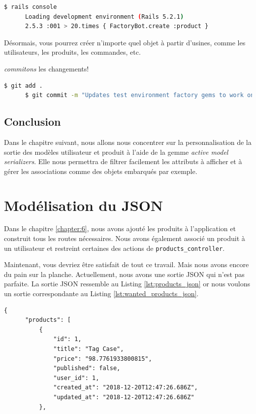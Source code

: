 \documentclass[]{report}
\begin{document}
    \begin{scriptsize}
      \begin{lstlisting}[language=bash]
      $ rails console
      Loading development environment (Rails 5.2.1)
      2.5.3 :001 > 20.times { FactoryBot.create :product }
      \end{lstlisting}
    \end{scriptsize}

    Désormais, vous pourrez créer n'importe quel objet à partir d'usines, comme les utilisateurs, les produits, les commandes, etc.

    \textit{commitons} les changements!

    \begin{scriptsize}
      \begin{lstlisting}[language=bash]
      $ git add .
      $ git commit -m "Updates test environment factory gems to work on development"
      \end{lstlisting}
    \end{scriptsize}

  \section{Conclusion}

    Dans le chapitre suivant, nous allons nous concentrer sur la personnalisation de la sortie des modèles utilisateur et produit à l'aide de la gemme \textit{active model serializers}. Elle nous permettra de filtrer facilement les attributs à afficher et à gérer les associations comme des objets embarqués par exemple.

\chapter{Modélisation du JSON}\label{chapter:7}

  Dans le chapitre \ref{chapter:6}, nous avons ajouté les produits à l'application et construit tous les routes nécessaires. Nous avons également associé un produit à un utilisateur et restreint certaines des actions de \verb|products_controller|.

  Maintenant, vous devriez être satisfait de tout ce travail. Mais nous avons encore du pain sur la planche. Actuellement, nous avons une sortie JSON qui n'est pas parfaite. La sortie JSON ressemble au Listing \ref{lst:products_json} or nous voulons un sortie correspondante au Listing \ref{lst:wanted_products_json}.

  \begin{scriptsize}
    \begin{lstlisting}[caption={Exemple de la sortie JSON actuelle pour la route products}, label={lst:products_json}]
    {
      "products": [
          {
              "id": 1,
              "title": "Tag Case",
              "price": "98.7761933800815",
              "published": false,
              "user_id": 1,
              "created_at": "2018-12-20T12:47:26.686Z",
              "updated_at": "2018-12-20T12:47:26.686Z"
          },
    \end{lstlisting}
  \end{scriptsize}
\end{document}
